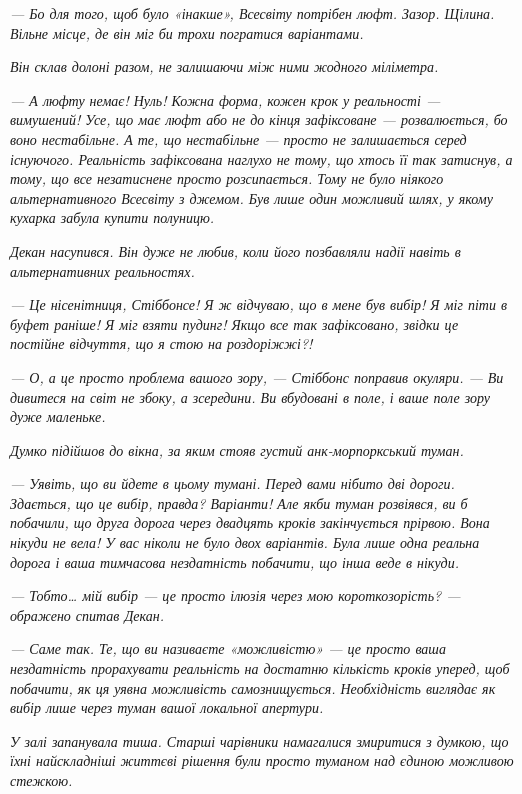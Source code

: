 \documentclass[12pt, a4paper, openany]{book}
\begin{document}
\begin{terrybox}
\textit{--- Бо для того, щоб було «інакше», Всесвіту потрібен \emph{люфт}. Зазор. Щілина. Вільне місце, де він міг би трохи погратися варіантами.}

\textit{Він склав долоні разом, не залишаючи між ними жодного міліметра.}

\textit{--- А люфту немає! Нуль! Кожна форма, кожен крок у реальності --- вимушений! Усе, що має люфт або не до кінця зафіксоване --- розвалюється, бо воно нестабільне. А те, що нестабільне --- просто не залишається серед існуючого. Реальність зафіксована наглухо не тому, що хтось її так затиснув, а тому, що все незатиснене просто розсипається. Тому не було ніякого альтернативного Всесвіту з джемом. Був лише один можливий шлях, у якому кухарка забула купити полуницю.}

\textit{Декан насупився. Він дуже не любив, коли його позбавляли надії навіть в альтернативних реальностях.}

\textit{--- Це нісенітниця, Стіббонсе! Я ж \emph{відчуваю}, що в мене був вибір! Я міг піти в буфет раніше! Я міг взяти пудинг! Якщо все так зафіксовано, звідки це постійне відчуття, що я стою на роздоріжжі?!}

\textit{--- О, а це просто проблема вашого зору, --- Стіббонс поправив окуляри. --- Ви дивитеся на світ не збоку, а зсередини. Ви вбудовані в поле, і ваше поле зору дуже маленьке.}

\textit{Думко підійшов до вікна, за яким стояв густий анк-морпоркський туман.}

\textit{--- Уявіть, що ви йдете в цьому тумані. Перед вами нібито дві дороги. Здається, що це вибір, правда? Варіанти! Але якби туман розвіявся, ви б побачили, що друга дорога через двадцять кроків закінчується прірвою. Вона нікуди не вела! У вас ніколи не було двох варіантів. Була лише одна реальна дорога і ваша тимчасова нездатність побачити, що інша веде в нікуди.}

\textit{--- Тобто\ldots{} мій вибір --- це просто ілюзія через мою короткозорість? --- ображено спитав Декан.}

\textit{--- Саме так. Те, що ви називаєте «можливістю» --- це просто ваша нездатність прорахувати реальність на достатню кількість кроків уперед, щоб побачити, як ця уявна можливість самознищується. Необхідність виглядає як вибір лише через туман вашої локальної апертури.}

\textit{У залі запанувала тиша. Старші чарівники намагалися змиритися з думкою, що їхні найскладніші життєві рішення були просто туманом над єдиною можливою стежкою.}


\end{terrybox}
\end{document}
